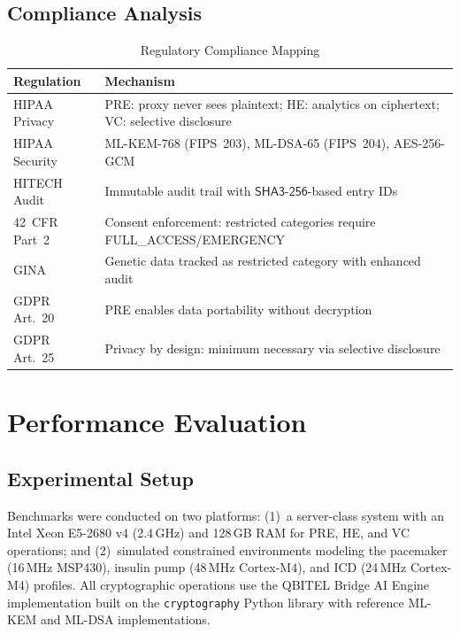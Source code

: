 \documentclass[conference,10pt]{IEEEtran}
\newcommand{\mlkem}{\textsf{ML-KEM}}
\newcommand{\mldsa}{\textsf{ML-DSA}}
\newcommand{\shaiii}{\textsf{SHA3-256}}
\newcommand{\aesgcm}{\textsf{AES-256-GCM}}
\begin{document}
\subsection{Compliance Analysis}

\begin{table}[htbp]
\centering
\caption{Regulatory Compliance Mapping}
\label{tab:compliance}
\begin{tabular}{@{}lp{5.5cm}@{}}
\toprule
\textbf{Regulation} & \textbf{Mechanism} \\
\midrule
HIPAA Privacy & PRE: proxy never sees plaintext; HE: analytics on ciphertext; VC: selective disclosure \\
HIPAA Security & \mlkem{}-768 (FIPS~203), \mldsa{}-65 (FIPS~204), \aesgcm{} \\
HITECH Audit & Immutable audit trail with $\shaiii{}$-based entry IDs \\
42~CFR Part~2 & Consent enforcement: restricted categories require FULL\_ACCESS/EMERGENCY \\
GINA & Genetic data tracked as restricted category with enhanced audit \\
GDPR Art.~20 & PRE enables data portability without decryption \\
GDPR Art.~25 & Privacy by design: minimum necessary via selective disclosure \\
\bottomrule
\end{tabular}
\end{table}

\section{Performance Evaluation}
\label{sec:performance}

\subsection{Experimental Setup}

Benchmarks were conducted on two platforms: (1)~a server-class system with an Intel Xeon E5-2680 v4 (2.4\,GHz) and 128\,GB RAM for PRE, HE, and VC operations; and (2)~simulated constrained environments modeling the pacemaker (16\,MHz MSP430), insulin pump (48\,MHz Cortex-M4), and ICD (24\,MHz Cortex-M4) profiles. All cryptographic operations use the QBITEL Bridge AI Engine implementation built on the \texttt{cryptography} Python library with reference \mlkem{} and \mldsa{} implementations.
\end{document}
